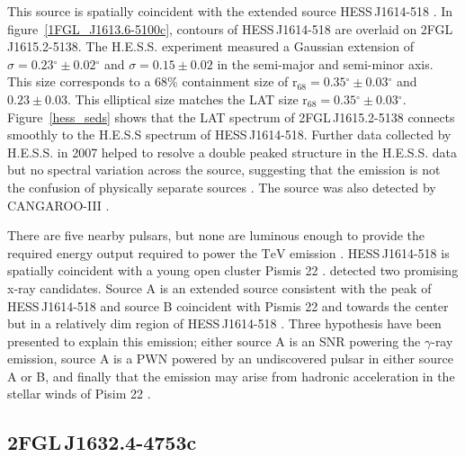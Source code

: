 \documentclass[12pt,preprint]{aastex}
\newcommand{\tev}{\text{TeV}\xspace}
\newcommand{\suzaku}{\text{{\em Suzaku}}\xspace}
\newcommand{\rsixeight}{{\ensuremath{\text{r}_{68}}}\xspace}
\renewcommand{\deg}{\ensuremath{^\circ}\xspace}
\begin{document}
This source is spatially coincident with the extended
\tev source HESS\,J1614-518 \citep{hess_plane_survey}. In
figure~\ref{1FGL_J1613.6-5100c}, contours of HESS\,J1614-518 are overlaid
on 2FGL\,J1615.2-5138.  The H.E.S.S. experiment measured a Gaussian
extension of $\sigma=0.23\deg\pm0.02\deg$ and $\sigma=0.15\pm0.02$
in the semi-major and semi-minor axis. This size corresponds
to a 68\% containment size of $\rsixeight=0.35\deg\pm0.03\deg$
and $0.23\pm0.03$.  This elliptical size matches the LAT size
$\rsixeight=0.35\deg\pm0.03\deg$.  Figure~\ref{hess_seds} shows
that the LAT spectrum of 2FGL\,J1615.2-5138 connects smoothly to
the H.E.S.S spectrum of HESS\,J1614-518.  Further data collected by
H.E.S.S. in 2007 helped to resolve a double peaked structure in the
H.E.S.S. data but no spectral variation across the source, suggesting
that the emission is not the confusion of physically separate sources
\citep{closer_look_hess_j1614-518}.  The source was also detected by
CANGAROO-III \citep{cangaroo_j1614-518}.

\begin{shaded}
There are five nearby pulsars, but none are luminous enough to
provide the required energy output required to power the $\tev$ 
emission \citep{closer_look_hess_j1614-518}.  HESS\,J1614-518
is spatially coincident with a young open cluster Pismis 22
\citep{hess_1614_landi_atel,closer_look_hess_j1614-518}.
\suzaku detected two
promising x-ray candidates. Source A is an extended source consistent
with the peak of HESS\,J1614-518 and source B coincident with Pismis 22
and towards the center but in a relatively dim region of HESS\,J1614-518
\citep{suazku_hess_j1614_518}.  Three hypothesis have been presented to
explain this emission; either source A is an SNR powering the $\gamma$-ray
emission, source A is a PWN powered by an undiscovered pulsar in either
source A or B, and finally that the emission may arise from hadronic 
acceleration in the stellar winds of Pisim 22 \citep{cangaroo_j1614-518}.
\end{shaded}

\subsection{2FGL\,J1632.4-4753c}
\label{section_2FGL_J1632.4-4753c}


\end{document}
